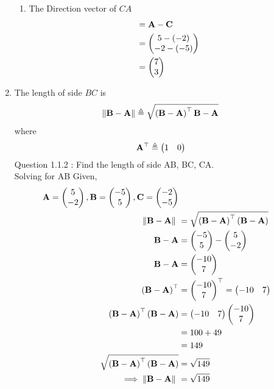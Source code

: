 \documentclass[11pt]{book}
\begin{document}
\begin{enumerate}[label=\thesection.\arabic*.,ref=\thesection.\theenumi]
\begin{enumerate}
  \item  The Direction vector of $CA$  \begin{align} &= \mathbf{A} - \mathbf{C} \\ 
 &= \begin{pmatrix} 5 - (-2)\\ -2 - (-5) \end{pmatrix} \\&= \begin{pmatrix} 7\\ 3 \end{pmatrix}
  \end{align}
 \end{enumerate}

\item The length of side $BC$ is 
		\begin{align}
			\left\lVert\mathbf{B}-\mathbf{A}\right\rVert \triangleq \sqrt{\left(\mathbf{B}-\mathbf{A}\right)^{\top}{\mathbf{B}-\mathbf{A}}}
		\end{align}
		where
		\begin{align}
			\mathbf{A}^{\top}\triangleq\begin{pmatrix}1 & 0\end{pmatrix}
		\end{align}
Question 1.1.2 : Find the length of side AB, BC, CA.\\
\solution
Solving for AB
Given, 
\begin{align}
\vec{A} = \myvec{5\\-2},
\vec{B} = \myvec{-5\\5},
\vec{C} = \myvec{-2\\-5} \\  
 \norm{\vec{B}-\vec{A}}\ &=  \sqrt{\brak{\vec{B}-\vec{A}}^{\top}\brak{\vec{B}-\vec{A}}} \\
 \vec{B}-\vec{A} &= \myvec{-5\\ 5} - \myvec{5 \\ -2} \\
 \vec{B}-\vec{A} &= \myvec{-10\\ 7} \\
 \brak{\vec{B}-\vec{A}}^{\top} &= {\myvec{-10\\ 7}}^{\top} = \myvec{-10 & 7} \\
\brak{\vec{B}-\vec{A}}^{\top}\brak{\vec{B}-\vec{A}} &= \myvec{-10 &  7} \myvec{-10 \\  7}\\
             &= 100+49 \\
             &= 149 \\  
 \sqrt{\brak{\vec{B}-\vec{A}}^{\top}\brak{\vec{B}-\vec{A}}} &= \sqrt{149}	\\
	\implies \norm{\vec{B}-\vec{A}}\ &= \sqrt{149}
\end{align}


\end{enumerate}
\end{document}

